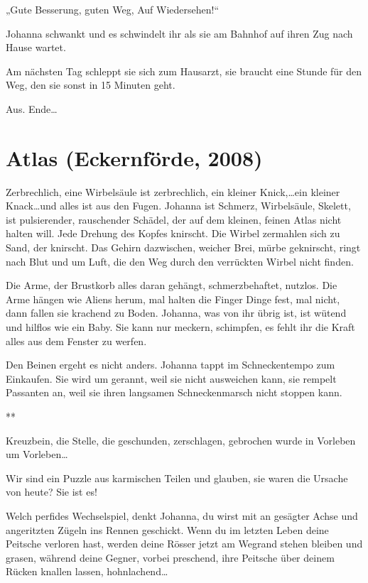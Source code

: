 \documentclass[10pt,titlepage,a5paper]{book}
\newcommand{\sterne}{\par{\centering ***\par}}
\begin{document}
„Gute Besserung, guten Weg, Auf Wiedersehen!“

Johanna schwankt und es schwindelt ihr als sie am Bahnhof auf ihren Zug nach Hause wartet.

Am nächsten Tag schleppt sie sich zum Hausarzt, sie braucht eine Stunde für den Weg, den sie sonst in 15 Minuten geht.

Aus. Ende\dots 



\section*{Atlas (Eckernförde, 2008)}



Zerbrechlich, eine Wirbelsäule ist zerbrechlich, ein kleiner Knick,\dots  ein kleiner Knack\dots  und alles ist aus den Fugen. 
Johanna ist Schmerz, Wirbelsäule, Skelett, ist pulsierender, rauschender Schädel, der auf dem kleinen, feinen Atlas nicht halten will. Jede Drehung des Kopfes knirscht. Die Wirbel zermahlen sich zu Sand, der knirscht. Das Gehirn dazwischen, weicher Brei, mürbe geknirscht, ringt nach Blut und um Luft, die den Weg durch den verrückten Wirbel nicht finden.

Die Arme, der Brustkorb alles daran gehängt, schmerzbehaftet, nutzlos. Die Arme hängen wie Aliens herum, mal halten die Finger Dinge fest, mal nicht, dann fallen sie krachend zu Boden. Johanna, was von ihr übrig ist, ist wütend und hilflos wie ein Baby. Sie kann nur meckern, schimpfen, es fehlt ihr die Kraft alles aus dem Fenster zu werfen. 

Den Beinen ergeht es nicht anders. Johanna tappt im Schneckentempo zum Einkaufen. Sie wird um gerannt, weil sie nicht ausweichen kann, sie rempelt Passanten an, weil sie ihren langsamen Schneckenmarsch nicht stoppen kann. 

\sterne

Kreuzbein, die Stelle, die geschunden, zerschlagen, gebrochen wurde in Vorleben um Vorleben\dots 

Wir sind ein Puzzle aus karmischen Teilen und glauben, sie waren die Ursache von heute? Sie ist es!

Welch perfides Wechselspiel, denkt Johanna, du wirst mit an gesägter Achse und angeritzten Zügeln ins Rennen geschickt. Wenn du im letzten Leben deine Peitsche verloren hast, werden deine Rösser jetzt am Wegrand stehen bleiben und grasen, während deine Gegner, vorbei preschend, ihre Peitsche über deinem Rücken knallen lassen, hohnlachend\dots 
\end{document}
